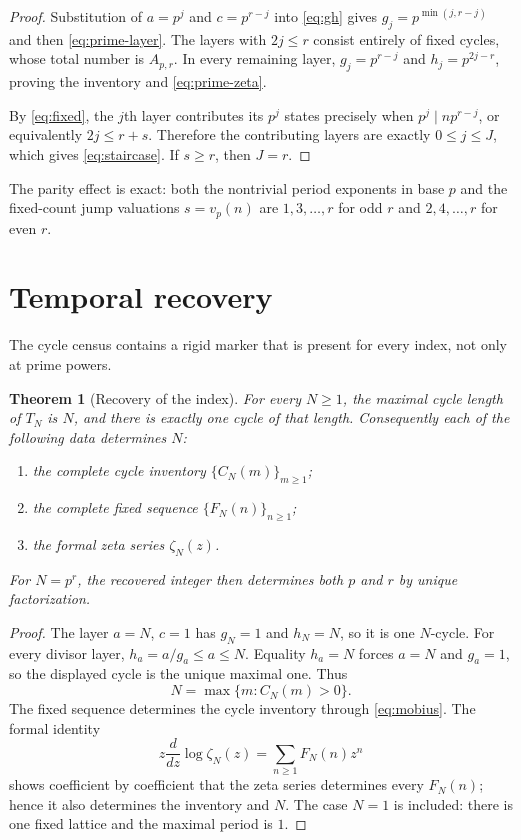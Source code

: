 \documentclass[11pt,a4paper]{amsart}
\newtheorem{theorem}{Theorem}[section]
\begin{document}
\begin{proof}
Substitution of $a=p^j$ and $c=p^{r-j}$ into \cref{eq:gh} gives
$g_j=p^{\min(j,r-j)}$ and then \eqref{eq:prime-layer}.  The layers with
$2j\leq r$ consist entirely of fixed cycles, whose total number is
$A_{p,r}$.  In every remaining layer, $g_j=p^{r-j}$ and
$h_j=p^{2j-r}$, proving the inventory and \eqref{eq:prime-zeta}.

By \eqref{eq:fixed}, the $j$th layer contributes its $p^j$ states precisely
when $p^j\mid n p^{r-j}$, or equivalently $2j\leq r+s$.  Therefore the
contributing layers are exactly $0\leq j\leq J$, which gives
\eqref{eq:staircase}.  If $s\geq r$, then $J=r$.
\end{proof}

The parity effect is exact: both the nontrivial period exponents in base $p$
and the fixed-count jump valuations $s=v_p(n)$ are $1,3,\ldots,r$ for odd
$r$ and $2,4,\ldots,r$ for even $r$.

\section{Temporal recovery}

The cycle census contains a rigid marker that is present for every index,
not only at prime powers.

\begin{theorem}[Recovery of the index]
\label{thm:recovery}
For every $N\geq1$, the maximal cycle length of $T_N$ is $N$, and there is
exactly one cycle of that length.  Consequently each of the following data
determines $N$:
\begin{enumerate}
 \item the complete cycle inventory $\{C_N(m)\}_{m\geq1}$;
 \item the complete fixed sequence $\{F_N(n)\}_{n\geq1}$;
 \item the formal zeta series $\zeta_N(z)$.
\end{enumerate}
For $N=p^r$, the recovered integer then determines both $p$ and $r$ by
unique factorization.
\end{theorem}

\begin{proof}
The layer $a=N$, $c=1$ has $g_N=1$ and $h_N=N$, so it is one $N$-cycle.
For every divisor layer,
$h_a=a/g_a\leq a\leq N$.  Equality $h_a=N$ forces $a=N$ and $g_a=1$,
so the displayed cycle is the unique maximal one.  Thus
\[
 N=\max\{m:C_N(m)>0\}.
\]
The fixed sequence determines the cycle inventory through
\cref{eq:mobius}.  The formal identity
\[
 z\frac{d}{dz}\log\zeta_N(z)=\sum_{n\geq1}F_N(n)z^n
\]
shows coefficient by coefficient that the zeta series determines every
$F_N(n)$; hence it also determines the inventory and $N$.
The case $N=1$ is included: there is one fixed lattice and the maximal
period is $1$.
\end{proof}
\end{document}
